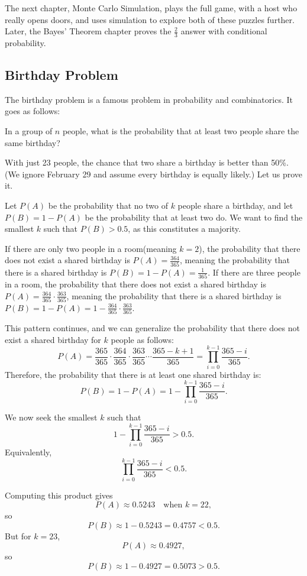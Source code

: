 The next chapter, Monte Carlo Simulation, plays the full game, with a host who really
opens doors, and uses simulation to explore both of these puzzles further. Later, the Bayes' Theorem
chapter proves the $\frac{2}{3}$ answer with conditional probability.


\subsection{Birthday Problem}
The birthday problem is a famous problem in probability and combinatorics. It goes as follows:
\begin{theorem}
    In a group of $n$ people, what is the probability that at least two people share the same birthday?
\end{theorem}
With just 23 people, the chance that two share a birthday is better than
50\%. (We ignore February 29 and assume every birthday is equally
likely.) Let us prove it.

Let $P(A)$ be the probability that no two of $k$ people share a birthday,
and let $P(B) = 1 - P(A)$ be the probability that at least two do. We want to find the smallest $k$ such that $P(B) > 0.5$, as this constitutes a majority.

If there are only two people in a room(meaning $k=2$), the probability that there does not exist a shared birthday is $P(A) = \tfrac{364}{365}$, meaning the probability that there is a shared birthday is $P(B) = 1 - P(A) = \tfrac{1}{365}$. If there are three people in a room, the probability that there does not exist a shared birthday is $P(A) = \tfrac{364}{365} \cdot \tfrac{363}{365}$, meaning the probability that there is a shared birthday is $P(B) = 1 - P(A) = 1 - \tfrac{364}{365} \cdot \tfrac{363}{365}$.

This pattern continues, and we can generalize the probability that there does not exist a shared birthday for $k$ people as follows:
\[P(A) = \frac{365}{365} \cdot \frac{364}{365} \cdot \frac{363}{365} \cdots \frac{365-k+1}{365} = \prod_{i=0}^{k-1} \frac{365 - i}{365}.\]
Therefore, the probability that there is at least one shared birthday is:
\[P(B) = 1 - P(A) = 1 - \prod_{i=0}^{k-1} \frac{365 - i}{365}.\]

We now seek the smallest $k$ such that
\[
    1-\prod_{i=0}^{k-1}\frac{365-i}{365} > 0.5.
\]
Equivalently,
\[
    \prod_{i=0}^{k-1}\frac{365-i}{365} < 0.5.
\]

Computing this product gives
\[
    P(A)\approx 0.5243 \quad \text{when } k=22,
\]
so
\[
    P(B)\approx 1-0.5243=0.4757<0.5.
\]
But for $k=23$,
\[
    P(A)\approx 0.4927,
\]
so
\[
    P(B)\approx 1-0.4927=0.5073>0.5.
\]

